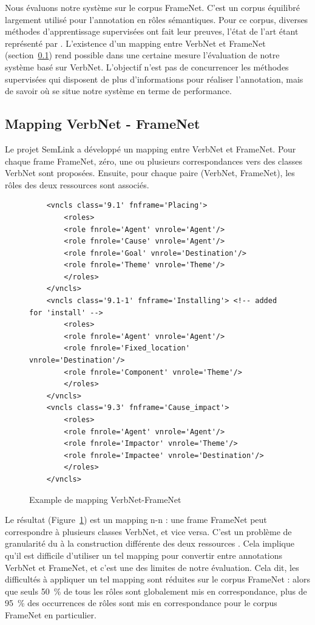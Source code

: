 Nous évaluons notre système sur le corpus FrameNet. C'est un corpus équilibré
largement utilisé pour l'annotation en rôles sémantiques. Pour ce corpus,
diverses méthodes d'apprentissage supervisées ont fait leur preuves, l'état de
l'art étant représenté par \cite{das2014frame}. L'existence d'un mapping entre
VerbNet et FrameNet (section~\ref{subsec:mapping}) rend possible dans une
certaine mesure l'évaluation de notre système basé sur VerbNet. L'objectif
n'est pas de concurrencer les méthodes supervisées qui disposent de plus
d'informations pour réaliser l'annotation, mais de savoir où se situe notre
système en terme de performance.

\subsection{Mapping VerbNet - FrameNet}
\label{subsec:mapping}

Le projet SemLink a développé un mapping entre VerbNet et FrameNet. Pour chaque
frame FrameNet, zéro, une ou plusieurs correspondances vers des classes VerbNet
sont proposées. Ensuite, pour chaque paire (VerbNet, FrameNet), les rôles des
deux ressources sont associés.

\begin{figure}[ht]
    \begin{verbatim}
    <vncls class='9.1' fnframe='Placing'>
        <roles>
        <role fnrole='Agent' vnrole='Agent'/>
        <role fnrole='Cause' vnrole='Agent'/>
        <role fnrole='Goal' vnrole='Destination'/>
        <role fnrole='Theme' vnrole='Theme'/>
        </roles>
    </vncls>
    <vncls class='9.1-1' fnframe='Installing'> <!-- added for 'install' -->
        <roles>
        <role fnrole='Agent' vnrole='Agent'/>
        <role fnrole='Fixed_location' vnrole='Destination'/>
        <role fnrole='Component' vnrole='Theme'/>
        </roles>
    </vncls>
    <vncls class='9.3' fnframe='Cause_impact'>
        <roles>
        <role fnrole='Agent' vnrole='Agent'/>
        <role fnrole='Impactor' vnrole='Theme'/>
        <role fnrole='Impactee' vnrole='Destination'/>
        </roles>
    </vncls>
    \end{verbatim}
    \caption{\label{fig:mapping}Example de mapping VerbNet-FrameNet}
\end{figure}

Le résultat (Figure~\ref{fig:mapping}) est un mapping n-n : une frame FrameNet
peut correspondre à plusieurs classes VerbNet, et vice versa. C'est un problème
de granularité du à la construction différente des deux ressources
\citep{palmer2009semlink}. Cela implique qu'il est difficile d'utiliser un tel
mapping pour convertir entre annotations VerbNet et FrameNet, et c'est une des
limites de notre évaluation.  Cela dit, les difficultés à appliquer un tel
mapping sont réduites sur le corpus FrameNet : alors que seuls 50~\% de tous
les rôles sont globalement mis en correspondance, plus de 95~\% des occurrences
de rôles sont mis en correspondance pour le corpus FrameNet en particulier.

